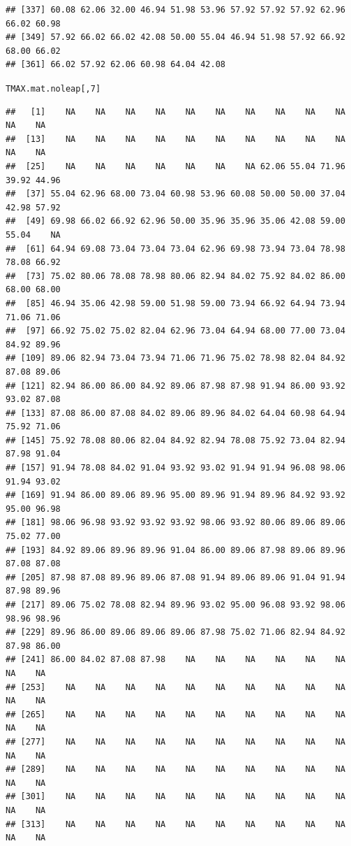 \documentclass{article}\usepackage[]{graphicx}\usepackage[]{color}
\makeatletter
\newcommand{\hlnum}[1]{\textcolor[rgb]{0.686,0.059,0.569}{#1}}%
\newcommand{\hlstd}[1]{\textcolor[rgb]{0.345,0.345,0.345}{#1}}%
\newenvironment{kframe}{%
 \def\at@end@of@kframe{}%
 \ifinner\ifhmode%
  \def\at@end@of@kframe{\end{minipage}}%
  \begin{minipage}{\columnwidth}%
 \fi\fi%
 \def\FrameCommand##1{\hskip\@totalleftmargin \hskip-\fboxsep
 \colorbox{shadecolor}{##1}\hskip-\fboxsep
     \hskip-\linewidth \hskip-\@totalleftmargin \hskip\columnwidth}%
 \MakeFramed {\advance\hsize-\width
   \@totalleftmargin\z@ \linewidth\hsize
   \@setminipage}}%
 {\par\unskip\endMakeFramed%
 \at@end@of@kframe}
\newenvironment{knitrout}{}{} %
\makeatother
\begin{document}
\begin{knitrout}
\begin{kframe}
\begin{verbatim}
## [337] 60.08 62.06 32.00 46.94 51.98 53.96 57.92 57.92 57.92 62.96 66.02 60.98
## [349] 57.92 66.02 66.02 42.08 50.00 55.04 46.94 51.98 57.92 66.92 68.00 66.02
## [361] 66.02 57.92 62.06 60.98 64.04 42.08
\end{verbatim}
\begin{alltt}
\hlstd{TMAX.mat.noleap[,}\hlnum{7}\hlstd{]}
\end{alltt}
\begin{verbatim}
##   [1]    NA    NA    NA    NA    NA    NA    NA    NA    NA    NA    NA    NA
##  [13]    NA    NA    NA    NA    NA    NA    NA    NA    NA    NA    NA    NA
##  [25]    NA    NA    NA    NA    NA    NA    NA 62.06 55.04 71.96 39.92 44.96
##  [37] 55.04 62.96 68.00 73.04 60.98 53.96 60.08 50.00 50.00 37.04 42.98 57.92
##  [49] 69.98 66.02 66.92 62.96 50.00 35.96 35.96 35.06 42.08 59.00 55.04    NA
##  [61] 64.94 69.08 73.04 73.04 73.04 62.96 69.98 73.94 73.04 78.98 78.08 66.92
##  [73] 75.02 80.06 78.08 78.98 80.06 82.94 84.02 75.92 84.02 86.00 68.00 68.00
##  [85] 46.94 35.06 42.98 59.00 51.98 59.00 73.94 66.92 64.94 73.94 71.06 71.06
##  [97] 66.92 75.02 75.02 82.04 62.96 73.04 64.94 68.00 77.00 73.04 84.92 89.96
## [109] 89.06 82.94 73.04 73.94 71.06 71.96 75.02 78.98 82.04 84.92 87.08 89.06
## [121] 82.94 86.00 86.00 84.92 89.06 87.98 87.98 91.94 86.00 93.92 93.02 87.08
## [133] 87.08 86.00 87.08 84.02 89.06 89.96 84.02 64.04 60.98 64.94 75.92 71.06
## [145] 75.92 78.08 80.06 82.04 84.92 82.94 78.08 75.92 73.04 82.94 87.98 91.04
## [157] 91.94 78.08 84.02 91.04 93.92 93.02 91.94 91.94 96.08 98.06 91.94 93.02
## [169] 91.94 86.00 89.06 89.96 95.00 89.96 91.94 89.96 84.92 93.92 95.00 96.98
## [181] 98.06 96.98 93.92 93.92 93.92 98.06 93.92 80.06 89.06 89.06 75.02 77.00
## [193] 84.92 89.06 89.96 89.96 91.04 86.00 89.06 87.98 89.06 89.96 87.08 87.08
## [205] 87.98 87.08 89.96 89.06 87.08 91.94 89.06 89.06 91.04 91.94 87.98 89.96
## [217] 89.06 75.02 78.08 82.94 89.96 93.02 95.00 96.08 93.92 98.06 98.96 98.96
## [229] 89.96 86.00 89.06 89.06 89.06 87.98 75.02 71.06 82.94 84.92 87.98 86.00
## [241] 86.00 84.02 87.08 87.98    NA    NA    NA    NA    NA    NA    NA    NA
## [253]    NA    NA    NA    NA    NA    NA    NA    NA    NA    NA    NA    NA
## [265]    NA    NA    NA    NA    NA    NA    NA    NA    NA    NA    NA    NA
## [277]    NA    NA    NA    NA    NA    NA    NA    NA    NA    NA    NA    NA
## [289]    NA    NA    NA    NA    NA    NA    NA    NA    NA    NA    NA    NA
## [301]    NA    NA    NA    NA    NA    NA    NA    NA    NA    NA    NA    NA
## [313]    NA    NA    NA    NA    NA    NA    NA    NA    NA    NA    NA    NA

\end{verbatim}
\end{kframe}
\end{knitrout}
\end{document}
